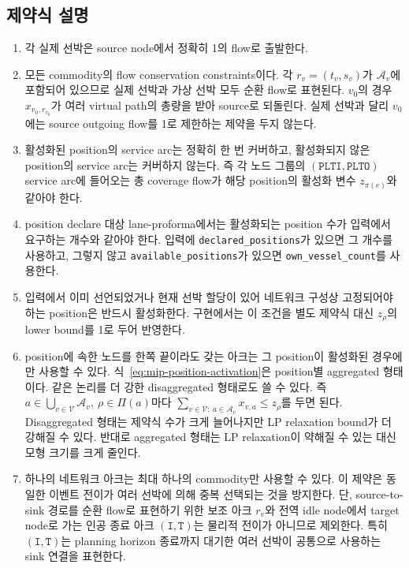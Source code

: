 \documentclass[11pt]{article}
\newcommand{\Vessels}{\mathcal{V}}
\newcommand{\Arcs}{\mathcal{A}}
\begin{document}
\subsection{제약식 설명}

\begin{enumerate}[label=(\arabic*), leftmargin=*]
  \item 각 실제 선박은 source node에서 정확히 1의 flow로 출발한다.
  \item 모든 commodity의 flow conservation constraints이다. 각 $r_v=(t_v,s_v)$가 $\Arcs_v$에 포함되어 있으므로 실제 선박과 가상 선박 모두 순환 flow로 표현된다. $v_0$의 경우 $x_{v_0,r_{v_0}}$가 여러 virtual path의 총량을 받아 source로 되돌린다. 실제 선박과 달리 $v_0$에는 source outgoing flow를 1로 제한하는 제약을 두지 않는다.
  \item 활성화된 position의 service arc는 정확히 한 번 커버하고, 활성화되지 않은 position의 service arc는 커버하지 않는다. 즉 각 노드 그룹의 $(\texttt{PLTI},\texttt{PLTO})$ service arc에 들어오는 총 coverage flow가 해당 position의 활성화 변수 $z_{\pi(e)}$와 같아야 한다.
  \item position declare 대상 lane-proforma에서는 활성화되는 position 수가 입력에서 요구하는 개수와 같아야 한다. 입력에 \texttt{declared\_positions}가 있으면 그 개수를 사용하고, 그렇지 않고 \texttt{available\_positions}가 있으면 \texttt{own\_vessel\_count}를 사용한다.
  \item 입력에서 이미 선언되었거나 현재 선박 할당이 있어 네트워크 구성상 고정되어야 하는 position은 반드시 활성화한다. 구현에서는 이 조건을 별도 제약식 대신 $z_\rho$의 lower bound를 1로 두어 반영한다.
  \item position에 속한 노드를 한쪽 끝이라도 갖는 아크는 그 position이 활성화된 경우에만 사용할 수 있다. 식~\eqref{eq:mip-position-activation}은 position별 aggregated 형태이다. 같은 논리를 더 강한 disaggregated 형태로도 쓸 수 있다. 즉 $a\in\bigcup_{v\in\Vessels}\Arcs_v,\ \rho\in\Pi(a)$마다 $\sum_{v\in\Vessels:\ a\in\Arcs_v}x_{v,a}\le z_\rho$를 두면 된다. Disaggregated 형태는 제약식 수가 크게 늘어나지만 LP relaxation bound가 더 강해질 수 있다. 반대로 aggregated 형태는 LP relaxation이 약해질 수 있는 대신 모형 크기를 크게 줄인다.
  \item 하나의 네트워크 아크는 최대 하나의 commodity만 사용할 수 있다. 이 제약은 동일한 이벤트 전이가 여러 선박에 의해 중복 선택되는 것을 방지한다. 단, source-to-sink 경로를 순환 flow로 표현하기 위한 보조 아크 $r_v$와 전역 idle node에서 target node로 가는 인공 종료 아크 $(\texttt{I},\texttt{T})$는 물리적 전이가 아니므로 제외한다. 특히 $(\texttt{I},\texttt{T})$는 planning horizon 종료까지 대기한 여러 선박이 공통으로 사용하는 sink 연결을 표현한다.

\end{enumerate}
\end{document}
